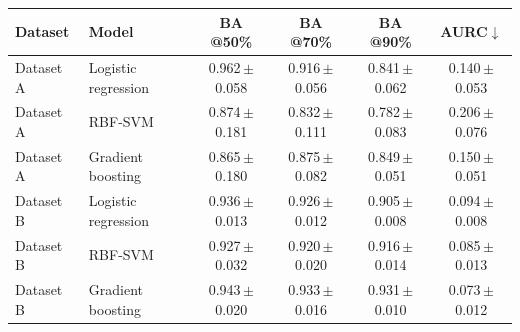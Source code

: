 \begin{tabular}{llcccc}\toprule
Dataset & Model & BA @50\% & BA @70\% & BA @90\% & AURC$\downarrow$\\\midrule
Dataset A & Logistic regression & 0.962\,{\scriptsize$\pm$0.058} & 0.916\,{\scriptsize$\pm$0.056} & 0.841\,{\scriptsize$\pm$0.062} & 0.140\,{\scriptsize$\pm$0.053}\\
Dataset A & RBF-SVM & 0.874\,{\scriptsize$\pm$0.181} & 0.832\,{\scriptsize$\pm$0.111} & 0.782\,{\scriptsize$\pm$0.083} & 0.206\,{\scriptsize$\pm$0.076}\\
Dataset A & Gradient boosting & 0.865\,{\scriptsize$\pm$0.180} & 0.875\,{\scriptsize$\pm$0.082} & 0.849\,{\scriptsize$\pm$0.051} & 0.150\,{\scriptsize$\pm$0.051}\\
Dataset B & Logistic regression & 0.936\,{\scriptsize$\pm$0.013} & 0.926\,{\scriptsize$\pm$0.012} & 0.905\,{\scriptsize$\pm$0.008} & 0.094\,{\scriptsize$\pm$0.008}\\
Dataset B & RBF-SVM & 0.927\,{\scriptsize$\pm$0.032} & 0.920\,{\scriptsize$\pm$0.020} & 0.916\,{\scriptsize$\pm$0.014} & 0.085\,{\scriptsize$\pm$0.013}\\
Dataset B & Gradient boosting & 0.943\,{\scriptsize$\pm$0.020} & 0.933\,{\scriptsize$\pm$0.016} & 0.931\,{\scriptsize$\pm$0.010} & 0.073\,{\scriptsize$\pm$0.012}\\
\bottomrule\end{tabular}